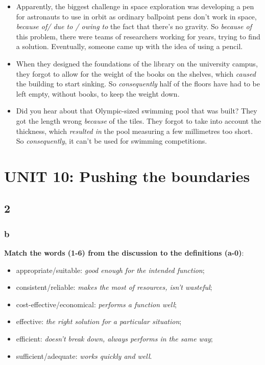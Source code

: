 \begin{itemize}

\item Apparently, the biggest challenge in space exploration was developing a pen for astronauts to use in orbit as ordinary ballpoint pens don't work in space, \textit{because of/ due to / owing to} the fact that there's no gravity. So \textit{because of} this problem, there were teams of researchers working for years, trying to find a solution. Eventually, someone came up with the idea of using a pencil.
\item When they designed the foundations of the library on the university campus, they forgot to allow for the weight of the books on the shelves, which \textit{caused} the building to start sinking. So \textit{consequently}  half of the floors have had to be left empty, without books, to keep the weight down.
\item Did you hear about that Olympic-sized swimming pool that was built? They got the length wrong \textit{because} of the tiles. They forgot to take into account the thickness, which \textit{resulted in} the pool measuring a few millimetres too short. So \textit{consequently}, it can't be used for swimming competitions.

\end{itemize} 



\section{UNIT 10: Pushing the boundaries}

\subsection{2}

\subsubsection{b}

\textbf{Match the words (1-6) from the discussion to the definitions (a-0)}:

\begin{itemize}

\item appropriate/suitable: \textit{good enough for the intended function};
\item consistent/reliable: \textit{makes the most of resources, isn't wasteful};
\item cost-effective/economical: \textit{performs a function well};
\item effective: \textit{the right solution for a particular situation};
\item efficient: \textit{doesn't break down, always performs in the same way};
\item sufficient/adequate: \textit{works quickly and well}.

\end{itemize}

